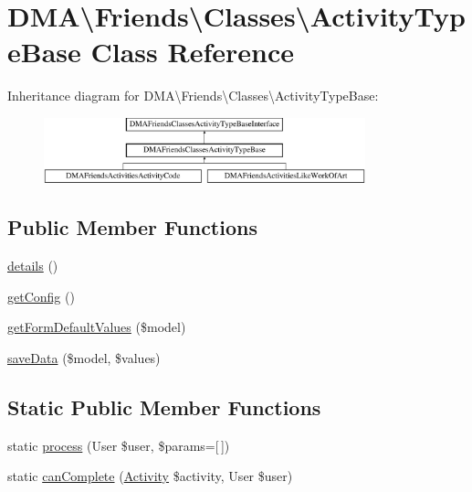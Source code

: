 \hypertarget{classDMA_1_1Friends_1_1Classes_1_1ActivityTypeBase}{}\section{D\+M\+A\textbackslash{}Friends\textbackslash{}Classes\textbackslash{}Activity\+Type\+Base Class Reference}
\label{classDMA_1_1Friends_1_1Classes_1_1ActivityTypeBase}
Inheritance diagram for D\+M\+A\textbackslash{}Friends\textbackslash{}Classes\textbackslash{}Activity\+Type\+Base\+:\begin{figure}[H]
\begin{center}
\leavevmode
\includegraphics[height=1.891892cm]{d3/d35/classDMA_1_1Friends_1_1Classes_1_1ActivityTypeBase}
\end{center}
\end{figure}
\subsection*{Public Member Functions}
\begin{DoxyCompactItemize}
\item 
\hyperlink{classDMA_1_1Friends_1_1Classes_1_1ActivityTypeBase_a6d83ca41e1c971c65cbc360e6097ad79}{details} ()
\item 
\hyperlink{classDMA_1_1Friends_1_1Classes_1_1ActivityTypeBase_ac540cd6b45fa5f41575523bbb300d18c}{get\+Config} ()
\item 
\hyperlink{classDMA_1_1Friends_1_1Classes_1_1ActivityTypeBase_ae46d0cc7e040eb4166e55a00d8d30dc8}{get\+Form\+Default\+Values} (\$model)
\item 
\hyperlink{classDMA_1_1Friends_1_1Classes_1_1ActivityTypeBase_a69d28814a4cc0c3798d1ab7a95e14ef3}{save\+Data} (\$model, \$values)
\end{DoxyCompactItemize}
\subsection*{Static Public Member Functions}
\begin{DoxyCompactItemize}
\item 
static \hyperlink{classDMA_1_1Friends_1_1Classes_1_1ActivityTypeBase_a27c11920b4815a809e7a2e62eae26094}{process} (User \$user, \$params=\mbox{[}$\,$\mbox{]})
\item 
static \hyperlink{classDMA_1_1Friends_1_1Classes_1_1ActivityTypeBase_acc0d37915d9170364f381945fd01f7c2}{can\+Complete} (\hyperlink{classDMA_1_1Friends_1_1Models_1_1Activity}{Activity} \$activity, User \$user)
\end{DoxyCompactItemize}
